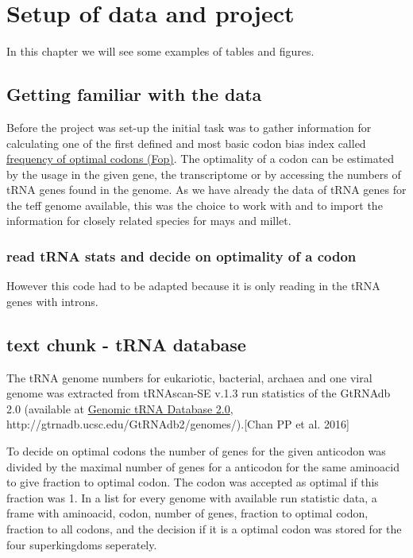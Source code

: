 \chapter{Setup of data and project}
In this chapter we will see some examples of tables and figures.

\section{Getting familiar with the data}
Before the project was set-up the initial task was to gather information for calculating one of the first defined and most basic codon bias index called \hyperlink{function:Fop}{frequency of optimal codons (Fop)}. The optimality of a codon can be estimated by the usage in the given gene, the transcriptome or by accessing the numbers of tRNA genes found in the genome. As we have already the data of tRNA genes for the teff genome available, this was the choice to work with and to import the information for closely related species for mays and millet.

\subsection{read tRNA stats and decide on optimality of a codon}
  
      
 
However this code had to be adapted because it is only reading in the tRNA genes with introns. 

\section{text chunk - tRNA database}
The tRNA genome numbers for eukariotic, bacterial, archaea and one viral genome was extracted from tRNAscan-SE v.1.3 run statistics of the GtRNAdb 2.0 (available at
\href{http://gtrnadb.ucsc.edu/GtRNAdb2/genomes/}{Genomic tRNA Database 2.0}, http://gtrnadb.ucsc.edu/GtRNAdb2/genomes/).[Chan PP et al. 2016]

To decide on optimal codons the number of genes for the given anticodon was divided by the maximal number of genes for a anticodon for the same aminoacid to give fraction to optimal codon. The codon was accepted as optimal if this fraction was 1. In a list for every genome with available run statistic data, a frame with aminoacid, codon, number of genes, fraction to optimal codon, fraction to all codons, and the decision if it is a optimal codon was stored for the four superkingdoms seperately.
 
